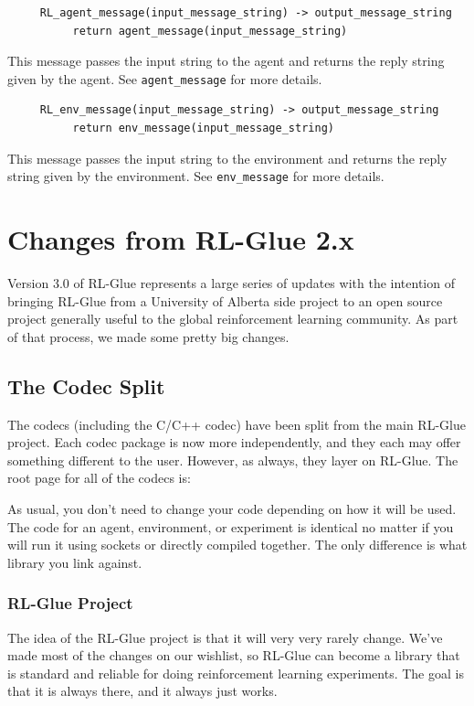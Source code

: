 \documentclass[11pt]{article}
\begin{document}
\begin{verbatim}
     RL_agent_message(input_message_string) -> output_message_string
          return agent_message(input_message_string)
\end{verbatim}
This message passes the input string to the agent and returns the reply string given by the agent. See \texttt{agent\_message} for more details.                
\begin{verbatim}
     RL_env_message(input_message_string) -> output_message_string
          return env_message(input_message_string)
\end{verbatim}
This message passes the input string to the environment and returns the reply string given by the environment. See \texttt{env\_message} for more details. 

\section{Changes from RL-Glue 2.x}
\label{change}
Version 3.0 of RL-Glue represents a large series of updates with the intention of bringing RL-Glue from a University of Alberta side project to an open source project generally useful to the global
reinforcement learning community.  As part of that process, we made some pretty big changes.

\subsection{The Codec Split}
The codecs (including the C/C++ codec) have been split from the main RL-Glue project.  Each codec package is now more independently, and they each may offer something different to the user.  However, as always, they layer on RL-Glue.  The root page for all of the codecs is:\newline
{}

As usual, you don't need to change your code depending on how it will be used.  The code for an agent, environment, or experiment is identical no matter if you will run it using sockets or directly compiled together.  The only difference is what library you link against.

\subsubsection{RL-Glue Project}
The idea of the RL-Glue project is that it will very very rarely change.  We've made most of the changes on our wishlist, so RL-Glue can become a library that is standard and reliable for doing reinforcement learning experiments.  The goal is that it is always there, and it always just works.
\end{document}
